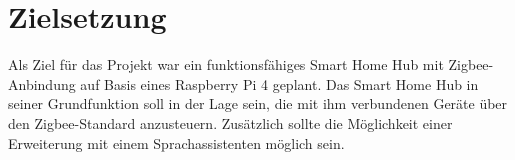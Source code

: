 \section{Zielsetzung}\label{zielsetzung}
Als Ziel für das Projekt war ein funktionsfähiges Smart Home Hub mit Zigbee-Anbindung auf Basis eines Raspberry Pi 4 geplant. 
Das Smart Home Hub in seiner Grundfunktion soll in der Lage sein, die mit ihm verbundenen Geräte über den Zigbee-Standard anzusteuern.
Zusätzlich sollte die Möglichkeit einer Erweiterung mit einem Sprachassistenten möglich sein.\par



\newpage